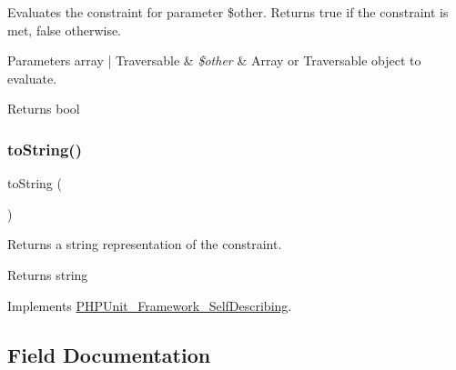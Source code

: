 Evaluates the constraint for parameter \$other. Returns true if the constraint is met, false otherwise.


\begin{DoxyParams}[1]{Parameters}
array | Traversable & {\em \$other} & Array or Traversable object to evaluate.\\
\hline
\end{DoxyParams}
\begin{DoxyReturn}{Returns}
bool 
\end{DoxyReturn}
\mbox{\label{class_p_h_p_unit___framework___constraint___array_subset_a5558c5d549f41597377fa1ea8a1cefa3}} 
\subsubsection{\texorpdfstring{to\+String()}{toString()}}
{\footnotesize\ttfamily to\+String (\begin{DoxyParamCaption}{ }\end{DoxyParamCaption})}

Returns a string representation of the constraint.

\begin{DoxyReturn}{Returns}
string 
\end{DoxyReturn}


Implements \mbox{\hyperlink{interface_p_h_p_unit___framework___self_describing_a5558c5d549f41597377fa1ea8a1cefa3}{P\+H\+P\+Unit\+\_\+\+Framework\+\_\+\+Self\+Describing}}.



\subsection{Field Documentation}
\mbox{\label{class_p_h_p_unit___framework___constraint___array_subset_a856bf794dded1ba70be4dfae635a1b06}} 
